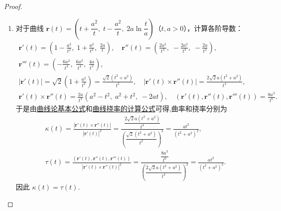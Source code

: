 \documentclass[../../main.tex]{subfiles}%
\begin{document}
\begin{proof}
\begin{enumerate}[(1)]
\item 对于曲线 $\bm{r}(t) = \left(t + \dfrac{a^2}{t},\; t - \dfrac{a^2}{t},\; 2a\ln\dfrac{t}{a}\right)$（$t,a>0$），计算各阶导数：
\begin{gather*}
\boldsymbol{r}'(t)=\left(1-\frac{a^2}{t^2},\;1+\frac{a^2}{t^2},\;\frac{2a}{t}\right),\quad
\boldsymbol{r}''(t)=\left(\frac{2a^2}{t^3},\;-\frac{2a^2}{t^3},\;-\frac{2a}{t^2}\right),\\
\boldsymbol{r}'''(t)=\left(-\frac{6a^2}{t^4},\;\frac{6a^2}{t^4},\;\frac{4a}{t^3}\right),\\
\left|\boldsymbol{r}'(t)\right|=\sqrt{2}\left(1+\frac{a^2}{t^2}\right)=\frac{\sqrt{2}(t^2+a^2)}{t^2},\quad
\left|\boldsymbol{r}'(t)\times\boldsymbol{r}''(t)\right|=\frac{2\sqrt{2}a(t^2+a^2)}{t^4},\\
\boldsymbol{r}'(t)\times\boldsymbol{r}''(t)=\frac{2a}{t^4}\left(a^2-t^2,\;a^2+t^2,\;-2at\right),\quad
(\boldsymbol{r}'(t),\boldsymbol{r}''(t),\boldsymbol{r}'''(t))=\frac{8a^3}{t^6}.
\end{gather*}
于是由\hyperref[theorem:曲线论基本公式]{曲线论基本公式}和\hyperref[theorem:微分几何-曲线挠率的计算公式]{曲线挠率的计算公式}可得,曲率和挠率分别为
\begin{gather*}
\kappa(t)=\frac{\left|\boldsymbol{r}'(t)\times\boldsymbol{r}''(t)\right|}{\left|\boldsymbol{r}'(t)\right|^3}
= \frac{\dfrac{2\sqrt{2}a(t^2+a^2)}{t^4}}{\left(\dfrac{\sqrt{2}(t^2+a^2)}{t^2}\right)^3}
= \frac{a t^2}{(t^2+a^2)^2},\\
\tau(t)=\frac{(\boldsymbol{r}'(t),\boldsymbol{r}''(t),\boldsymbol{r}'''(t))}{\left|\boldsymbol{r}'(t)\times\boldsymbol{r}''(t)\right|^2}
= \frac{\dfrac{8a^3}{t^6}}{\left(\dfrac{2\sqrt{2}a(t^2+a^2)}{t^4}\right)^2}
= \frac{a t^2}{(t^2+a^2)^2}.
\end{gather*}
因此 $\kappa(t)=\tau(t)$.
\end{enumerate}

\end{proof}
\end{document}
